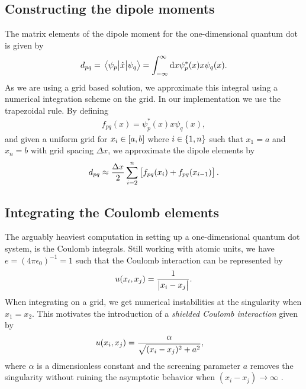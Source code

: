     \subsection{Constructing the dipole moments}
        The matrix elements of the dipole moment for the one-dimensional quantum
        dot is given by
        \begin{align}
            d_{pq}
            = \mel{\psi_{p}}{\hat{x}}{\psi_{q}}
            = \int_{-\infty}^{\infty}\dd x
            \psi^{*}_{p}(x) x \psi_{q}(x).
        \end{align}
        As we are using a grid based solution, we approximate this integral
        using a numerical integration scheme on the grid.
        In our implementation we use the trapezoidal rule.
        By defining
        \begin{align}
            f_{pq}(x) = \psi^{*}_{p}(x) x \psi_{q}(x),
        \end{align}
        and given a uniform grid for $x_i \in \left[ a, b \right]$ where $i \in \left\{ 1,
        n \right\}$ such that $x_1 = a$ and $x_n = b$ with grid spacing $\Delta x$, we
        approximate the dipole elements by
        \begin{align}
            d_{pq}
            \approx
            \frac{\Delta x}{2}\sum_{i = 2}^{n}\left[ 
                f_{pq}(x_{i}) + f_{pq}(x_{i - 1})
             \right].
        \end{align}


    \subsection{Integrating the Coulomb elements}
        The arguably heaviest computation in setting up a one-dimensional
        quantum dot system, is the Coulomb integrals.
        Still working with atomic units, we have $e = (4\pi \epsilon_0)^{-1} =
        1$ such that the Coulomb interaction can be represented by
        \begin{align}
            u(x_i, x_j) = \frac{1}{\abs{x_i - x_j}}.
        \end{align}
        When integrating on a grid, we get numerical instabilities at the
        singularity when $x_1 = x_2$.
        This motivates the introduction of a \emph{shielded Coulomb interaction}
        \cite{suq, skattum2013time, kristiansen2017time} given by
        \begin{align}
            u(x_i, x_j)
            &= \frac{\alpha}{\sqrt{(x_i - x_j)^2 + a^2}},
        \end{align}
        where $\alpha$ is a dimensionless constant and the screening parameter
        $a$ removes the singularity without ruining the asymptotic behavior
        when $(x_i - x_j) \to \infty$ \cite{suq, kristiansen2017time}.


